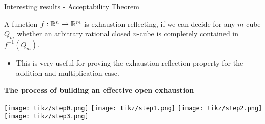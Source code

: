 \begin{frame}{Interesting results - Acceptability Theorem }
    \pause
    \begin{minipage}[t]{0.45\linewidth}
    \vspace{-2.5em}
    \begin{theorem}
        A function $f:\mathbb{R}^n \to\mathbb{R}^m$ is exhaustion-reflecting, if we can decide for any $m$-cube $Q_m$ whether an arbitrary rational closed $n$-cube is completely contained in $f^{-1}(Q_m)$.
    \end{theorem}
    \pause
    \begin{itemize}
        \item This is very useful for proving the exhaustion-reflection property for the addition and multiplication case.
    \end{itemize}

    \end{minipage}
    \begin{minipage}[t]{0.54\linewidth}
        \center
        \pause
        \vspace{-1em}
        \color{MidnightBlue}
        \textbf{The process of building an effective open exhaustion}
        \vspace{-1em}
        \begin{flushright}
            \pause
            \texttt{[image: tikz/step0.png]}
            \pause
            \texttt{[image: tikz/step1.png]}
            \pause
            \texttt{[image: tikz/step2.png]}
            \pause
            \texttt{[image: tikz/step3.png]}
        \end{flushright}
    \end{minipage}
\end{frame}